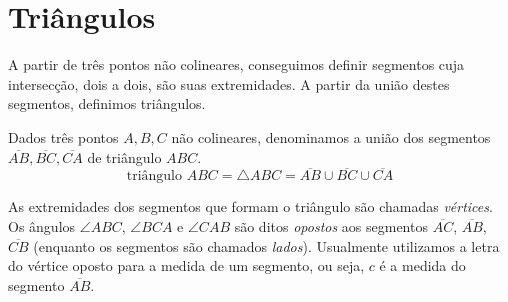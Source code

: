 \chapter{Triângulos}
A partir de três pontos não colineares, conseguimos definir segmentos cuja intersecção, dois a dois, são suas extremidades. A partir da união destes segmentos, definimos triângulos.
\begin{df}
Dados três pontos $A,B,C$ não colineares, denominamos a união dos segmentos $\overline{AB}, \overline{BC}, \overline{CA}$ de triângulo $ABC$.
\[\textrm{triângulo } ABC = \triangle ABC = \overline{AB} \cup \overline{BC} \cup \overline{CA}\]
\end{df}
As extremidades dos segmentos que formam o triângulo são chamadas \emph{vértices}. Os ângulos $\angle ABC$, $\angle BCA$ e $\angle CAB$ são ditos \emph{opostos} aos segmentos $\overline{AC}$, $\overline{AB}$, $\overline{CB}$ (enquanto os segmentos são chamados \emph{lados}). Usualmente utilizamos a letra do vértice oposto para a medida de um segmento, ou seja, $c$ é a medida do segmento $\overline{AB}$.

\Blindtext